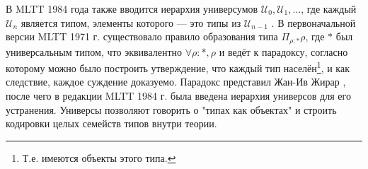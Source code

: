 \documentclass[14pt]{extarticle}
\begin{document}
	В MLTT 1984 года также вводится иерархия универсумов \(\mathcal{U}_0,\mathcal{U}_1,\dots\), где каждый \(\mathcal{U}_n\) является типом, элементы которого — это типы из \(\mathcal{U}_{n-1}\) \cite[13]{martinlof1984intuitionistic}. В первоначальной версии MLTT 1971 г. существовало правило образования типа \(\Pi_{\rho:*}\rho\), где \(*\) был универсальным типом, что эквивалентно \(\forall \rho:*,\rho\) и ведёт к парадоксу, согласно которому можно было построить утверждение, что каждый тип населён\footnote{Т.е. имеются объекты этого типа.}, и как следствие, каждое суждение доказуемо. Парадокс представил Жан-Ив Жирар \cite{girard1972paradox}, после чего в редакции MLTT 1984 г. была введена иерархия универсов для его устранения. Универсы позволяют говорить о "типах как объектах" и строить кодировки целых семейств типов внутри теории.
	 
\end{document}
